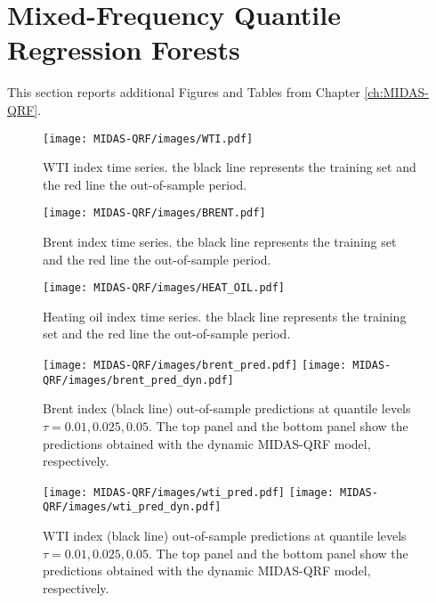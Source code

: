 \chapter{Mixed-Frequency Quantile
Regression Forests}\label{app:MIDAS-QRF}

This section reports additional Figures and Tables from Chapter \ref{ch:MIDAS-QRF}.




\begin{figure}[b]
    \centering
\texttt{[image: MIDAS-QRF/images/WTI.pdf]}
    \caption{WTI index time series. the black line represents the training set and the red line the out-of-sample period.}
    \label{fig:wti}
\end{figure}

\begin{figure}[h]
    \centering \texttt{[image: MIDAS-QRF/images/BRENT.pdf]}
    \caption{Brent index time series. the black line represents the training set and the red line the out-of-sample period.}
    \label{fig:brent}
\end{figure}

\begin{figure}[h]
    \centering
    \texttt{[image: MIDAS-QRF/images/HEAT\_OIL.pdf]}
    \caption{Heating oil index time series. the black line represents the training set and the red line the out-of-sample period.}
    \label{fig:heat}
\end{figure}

\begin{figure}[h]
    \centering
    \texttt{[image: MIDAS-QRF/images/brent\_pred.pdf]}
\texttt{[image: MIDAS-QRF/images/brent\_pred\_dyn.pdf]}
    \caption{Brent index (black line) out-of-sample predictions at quantile levels $\tau= 0.01, 0.025, 0.05$. The top panel and the bottom panel show the predictions obtained with the dynamic MIDAS-QRF model, respectively.}
    \label{fig:brent-pred}
\end{figure}

\begin{figure}[h]
    \centering
    \texttt{[image: MIDAS-QRF/images/wti\_pred.pdf]}
\texttt{[image: MIDAS-QRF/images/wti\_pred\_dyn.pdf]}
    \caption{WTI index (black line) out-of-sample predictions at quantile levels $\tau= 0.01, 0.025, 0.05$. The top panel and the bottom panel show the predictions obtained with the dynamic MIDAS-QRF model, respectively.}
    \label{fig:wti-pred}
\end{figure}

